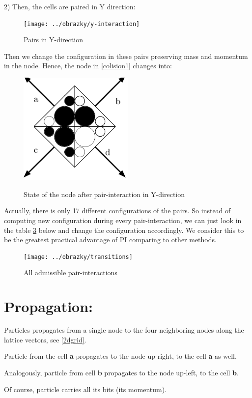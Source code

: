 2) Then, the cells are paired in Y direction:
\begin{figure}[htbp]
 \centering 
 \texttt{[image: ../obrazky/y-interaction]}
 \label{yinter}
 \caption{Pairs in Y-direction}
\end{figure}

 Then we change the configuration in these pairs preserving mass and momentum in the node. Hence, the node in \ref{colision1} changes into:
 \begin{figure}[htbp]
 \centering 
 \includegraphics[width=0.5\textwidth]{./img/node_3}
 \label{colision2}
 \caption{State of the node after pair-interaction in Y-direction}
\end{figure}
\newpage
Actually, there is only 17 different configurations of the pairs. So instead of computing new configuration during every pair-interaction, we can just look in the table \ref{transitions} below and change the configuration accordingly. We consider this to be the greatest practical advantage of PI comparing to other methods.
\newpage
\begin{figure}[htbp]
 \centering 
 \texttt{[image: ../obrazky/transitions]}
 \label{transitions}
 \caption{All admissible pair-interactions}
\end{figure}

\section{Propagation:}
Particles propagates from a single node to the four neighboring nodes along the lattice vectors, see \ref{2dgrid}.

Particle from the cell \textbf{a} propagates to the node up-right, to the cell \textbf{a} as well.

Analogously, particle from cell \textbf{b} propagates to the node up-left, to the cell \textbf{b}.

Of course, particle carries all its bits (its momentum).



